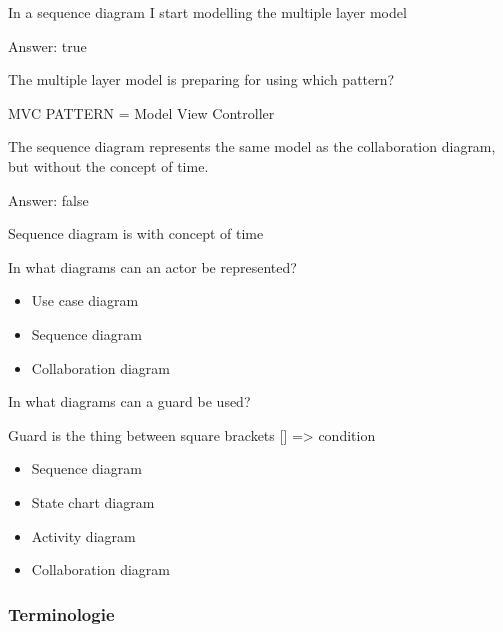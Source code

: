 \begin{question}
In a sequence diagram I start modelling the multiple layer model
\end{question}

\begin{solution}[print]
Answer: true
\end{solution}



\begin{question}
The multiple layer model is preparing for using which pattern?
\end{question}

\begin{solution}[print]
MVC PATTERN = Model View Controller
\end{solution}



\begin{question}
The sequence diagram represents the same model as the collaboration diagram, but without the concept of time.
\end{question}

\begin{solution}[print]
Answer: false

Sequence diagram is with concept of time
\end{solution}



\begin{question}
In what diagrams can an actor be represented?
\end{question}

\begin{solution}[print]
\begin{itemize}
    \item Use case diagram
    \item Sequence diagram
    \item Collaboration diagram
\end{itemize}
\end{solution}



\begin{question}
In what diagrams can a guard be used?
\end{question}

\begin{solution}[print]
Guard is the thing between square brackets [] => condition
\begin{itemize}
    \item Sequence diagram
    \item State chart diagram
    \item Activity diagram
    \item Collaboration diagram
\end{itemize}
\end{solution}

\subsubsection{Terminologie}


